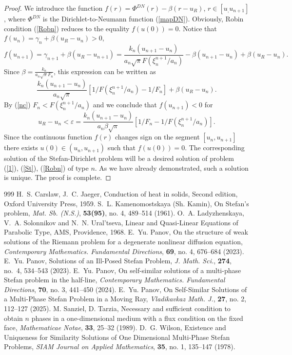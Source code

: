 \documentclass[12pt]{article}
\theoremstyle{plain}
\theoremstyle{definition}
\numberwithin{equation}{section}
\begin{document}
\begin{proof}
We introduce the function $f(r)=\Phi^{DN}(r)-\beta(r-u_R)$, $r\in [u_,u_{n+1}]$, where $\Phi^{DN}$ is the Dirichlet-to-Neumann function (\ref{mapDN}). Obviously, Robin condition (\ref{Robn}) reduces to the equality
$f(u(0))=0$. Notice that $f(u_n)=\gamma_n+\beta(u_R-u_n)>0$,
\[f(u_{n+1})=\gamma_{n+1}+\beta(u_R-u_{n+1})=\frac{k_n(u_{n+1}-u_n)}{a_n\sqrt{\pi}F(\xi^{n+1}_n/a_n)}-\beta(u_{n+1}-u_n)+\beta(u_R-u_n).\]
Since $\beta=\frac{k_n}{a_n\sqrt{\pi}F_n}$, this expression can be written as
\[\frac{k_n(u_{n+1}-u_n)}{a_n\sqrt{\pi}}[1/F(\xi^{n+1}_n/a_n)-1/F_n]+\beta(u_R-u_n).\]
By (\ref{nc}) $F_n<F(\xi^{n+1}_n/a_n)$ and we conclude that $f(u_{n+1})<0$ for
\[u_R-u_n<\varepsilon=\frac{k_n(u_{n+1}-u_n)}{a_n\beta\sqrt{\pi}}[1/F_n - 1/F(\xi^{n+1}_n/a_n)].\]
Since the continuous function $f(r)$ changes sign on the segment $[u_n,u_{n+1}]$ there exists
$u(0)\in (u_n,u_{n+1})$ such that $f(u(0))=0$. The corresponding solution of the Stefan-Dirichlet problem will be a desired solution of problem (\ref{1}), (\ref{St}), (\ref{Robn}) of type $n$. As we have already demonstrated, such a solution is unique. The proof is complete.
\end{proof}

\begin{thebibliography}{999}
\itemsep=-2pt
H.~S. Carslaw, J.~C. Jaeger, Conduction of heat in solids, Second edition, Oxford University Press, 1959.
S.~L. Kamenomostskaya (Sh. Kamin), On Stefan's problem,  {\it Mat. Sb. (N.S.)}, \textbf{53(95)}, no. 4, 489--514 (1961).
O.~A. Ladyzhenskaya, V.~A. Solonnikov and N.~N. Ural'tseva,
Linear and Quasi-Linear Equations of Parabolic Type, AMS, Providence, 1968.
E.~Yu. Panov, On the structure of weak solutions of the Riemann problem for a degenerate nonlinear diffusion equation, {\it Contemporary Mathematics. Fundamental Directions}, \textbf{69}, no. 4, 676--684 (2023).
E.~Yu. Panov, Solutions of an Ill-Posed Stefan Problem, {\it J. Math. Sci.}, \textbf{274}, no.~4, 534--543 (2023).
E.~Yu. Panov, On self-similar solutions of a multi-phase Stefan problem in the half-line,
{\it Contemporary Mathematics. Fundamental Directions}, \textbf{70}, no. 3, 441--450 (2024).
E.~Yu. Panov, On Self-Similar Solutions of a Multi-Phase Stefan Problem in a Moving Ray, {\it Vladikavkaz Math. J.}, \textbf{27}, no. 2, 112--127 (2025).
M. Sanziel, D. Tarzia, Necessary and sufficient condition to obtain $n$ phases in a one-dimensional medium with a
flux condition on the fixed face, {\it Mathematicae Notae}, \textbf{33}, 25--32 (1989).
D.~G. Wilson, Existence and Uniqueness for Similarity Solutions of One
Dimensional Multi-Phase Stefan Problems, {\it SIAM Journal on Applied Mathematics}, \textbf{35}, no. 1, 135--147 (1978).
\end{thebibliography}
\end{document}
